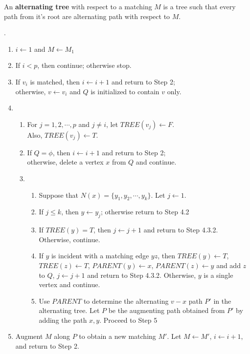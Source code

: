 \begin{definition}
	An \textbf{alternating tree} with respect to a matching $M$ is a tree such that every path from it's root are alternating path with respect to $M$.
\end{definition}

\begin{algorithm}.
	\begin{enumerate}
		\item $ i \leftarrow 1$ and $M \leftarrow M_1$
		\item If $i < p$, then continue; otherwise stop.
		\item If $v_i$ is matched, then $i \leftarrow i+1$ and return to Step 2;\\
			otherwise, $v \leftarrow v_i$ and $Q$ is initialized to contain $v$ only.
		\item 
			\begin{enumerate}[label=(\arabic*)]
				\item For $j = 1,2,\cdots,p$ and $j \ne i$, let $TREE(v_j) \leftarrow F$.\\
					Also, $TREE(v_j) \leftarrow T$.
				\item If $Q = \phi$, then $i \leftarrow i+1$ and return to Step 2;\\
					otherwise, delete a vertex $x$ from $Q$ and continue.
				\item 
					\begin{enumerate}[label=(\arabic*)]
						\item Suppose that $N(x) = \{y_1,y_2,\cdots,y_k\}$. Let $j \leftarrow 1$.
						\item If $j \le k$, then $y \leftarrow y_j$; otherwise return to Step 4.2
						\item If $TREE(y) = T$, then $j \leftarrow j+1$ and return to Step 4.3.2. Otherwise, continue.
						\item If $y$ is incident with a matching edge $yz$, then $TREE(y) \leftarrow T$, $TREE(z) \leftarrow T$, $PARENT(y) \leftarrow x$, $PARENT(z) \leftarrow y$ and add $z$ to $Q$, $j \leftarrow j+1$ and return to Step 4.3.2. Otherwise, $y$ is a single vertex and continue.
						\item Use $PARENT$ to determine the alternating $v-x$ path $P'$ in the alternating tree. Let $P$ be the augmenting path obtained from $P'$ by adding the path $x,y$. Proceed to Step 5
					\end{enumerate}
			\end{enumerate}
		\item Augment $M$ along $P$ to obtain a new matching $M'$. Let $M \leftarrow M'$, $i \leftarrow i+1$, and return to Step 2.
	\end{enumerate}
	\label{alg:maxmatching}
\end{algorithm}

